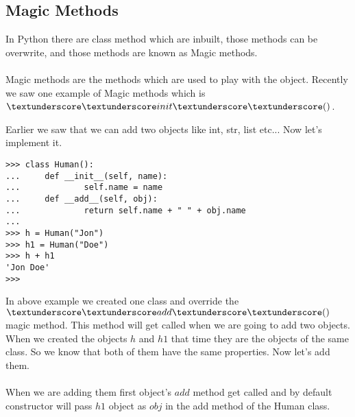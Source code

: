\documentclass[letterpaper,12pt]{book}
\begin{document}
\subsection{Magic Methods}
In Python there are class method which are inbuilt, those methods can be overwrite, and those methods are known as Magic methods.
\paragraph{}
Magic methods are the methods which are used to play with the object. Recently we saw one example of Magic methods which is $\textunderscore\textunderscore init \textunderscore\textunderscore()$.

Earlier we saw that we can add two objects like int, str, list etc... Now let's implement it. 
\begin{lstlisting}
>>> class Human():
...     def __init__(self, name):
...             self.name = name
...     def __add__(self, obj):
...             return self.name + " " + obj.name
... 
>>> h = Human("Jon")
>>> h1 = Human("Doe")
>>> h + h1
'Jon Doe'
>>> 
\end{lstlisting} 
In above example we created one class and override the $\textunderscore\textunderscore add \textunderscore\textunderscore()$ magic method. This method will get called when we are going to add two objects. When we created the objects $h$ and $h1$ that time they are the objects of the same class. So we know that both of them have the same properties. Now let's add them. 

\paragraph{}
When we are adding them first object's $add$ method get called and by default constructor will pass $h1$ object as $obj$ in the add method of the Human class.
\end{document}
